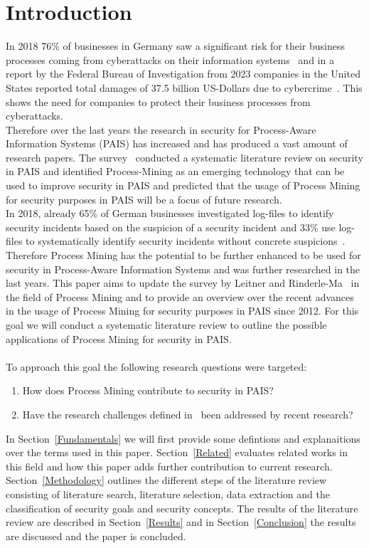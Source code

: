 \documentclass[runningheads]{llncs}
\begin{document}
\section{Introduction}\label{Introduction}
In 2018 76\% of businesses in Germany saw a significant risk for their business processes coming from cyberattacks on their information systems~\cite{Bsi} and in a report by the
Federal Bureau of Investigation from 2023 companies in the 
United States reported total damages of 37.5 billion US-Dollars due to cybercrime~\cite{fbi}. This shows the need for companies to protect their business processes from cyberattacks.\\
Therefore over the last years the research in security for Process-Aware Information Systems (PAIS) has increased and has produced a vast amount of research papers. The survey~\cite{Leitner2014273}
conducted a systematic literature review on security in PAIS and identified Process-Mining as an emerging technology that can be used to improve security in PAIS and predicted that
the usage of Process Mining for security purposes in PAIS will be a focus of future research.\\
In 2018, already 65\% of German businesses investigated log-files to identify security incidents based on the suspicion of a security incident and 33\% use log-files to systematically
identify security incidents without concrete suspicions~\cite{Bsi}.\\
Therefore Process Mining has the potential to be further enhanced to be used for security in Process-Aware Information Systems and was further researched in the last years. This paper
aims to update the survey by Leitner and Rinderle-Ma~\cite{Leitner2014273} in the field of Process Mining and to provide an overview over the recent advances in the usage of Process Mining for security purposes in PAIS since 2012. For this goal we will conduct a systematic literature
review to outline the possible applications of Process Mining for security in PAIS.\\
\\
To approach this goal the following research questions were targeted:
\begin{enumerate}
    \item How does Process Mining contribute to security in PAIS\@?
    \item Have the research challenges defined in~\cite{Leitner2014273} been addressed by recent research? 
\end{enumerate}

In Section~\ref{Fundamentals} we will first provide some defintions and explanaitions over the terms used in this paper. 
Section~\ref{Related} evaluates related works in this field and how this paper adds further contribution to current research.
Section~\ref{Methodology} outlines the different steps of the literature review consisting of literature search, literature selection, data extraction and the classification of security goals and security concepts.
The results of the literature review are described in Section~\ref{Results} and in Section~\ref{Conclusion} the results are discussed and the paper is concluded.
\end{document}
